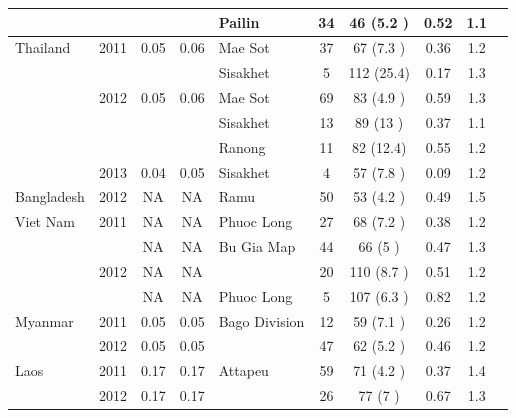 \documentclass[9pt,lineno]{elife}
\begin{document}
\begin{table}[btp]
{\begin{tabular}{p{1.4cm} c c c |p{1.7cm} c c c c p{2.7cm}}
                &               &               &               &Pailin&34   &46   (5.2 )&0.52 &1.1  &\\
\hline
Thailand        &2011           &0.05  &0.06  &Mae Sot&37   &67   (7.3 )&0.36 &1.2  &\multirow{3}{*}{\parbox{3.4cm}{\citet{Miotto2013, eLife2016}}}\\
                &               &               &               &Sisakhet&5    &112  (25.4)&0.17 &1.3  &\\
                &2012           &0.05  &0.06  &Mae Sot&69   &83   (4.9 )&0.59 &1.3  &\\
                &               &               &               &Sisakhet&13   &89   (13  )&0.37 &1.1  &\\
                &               &               &               &Ranong&11   &82   (12.4)&0.55 &1.2  &\\
                &2013           &0.04  &0.05  &Sisakhet&4    &57   (7.8 )&0.09 &1.2  &\\
\cline{1-9}
Bangladesh      &2012           &NA    &NA    &Ramu &50   &53   (4.2 )&0.49 &1.5  &\\
\cline{1-9}
Viet Nam        &2011           &NA    &NA    &Phuoc Long&27   &68   (7.2 )&0.38 &1.2  &\\
                &               &NA    &NA    &Bu Gia Map&44   &66   (5   )&0.47 &1.3  &\\
                &2012           &NA    &NA    &               &20   &110  (8.7 )&0.51 &1.2  &\\
                &               &NA    &NA    &Phuoc Long&5    &107  (6.3 )&0.82 &1.2  &\\
\cline{1-9}
Myanmar         &2011           &0.05  &0.05  &Bago Division &12   &59   (7.1 )&0.26 &1.2  &\\
                &2012           &0.05  &0.05  &               &47   &62   (5.2 )&0.46 &1.2  &\\
\cline{1-9}
Laos            &2011           &0.17  &0.17  &Attapeu&59   &71   (4.2 )&0.37 &1.4  &\\
                &2012           &0.17  &0.17  &               &26   &77   (7   )&0.67 &1.3  &\\
\hline
\bottomrule
\end{tabular}
}

\end{table}
\end{document}
